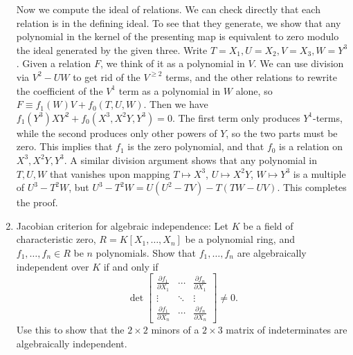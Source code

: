 \documentclass[12pt]{amsart}
\newcommand{\Q}{\mathbb{Q}}
\newcommand{\Z}{\mathbb{Z}}
\newcommand\itemB{\stepcounter{enumi}\item[(\theenumi)]}
\begin{document}
\begin{enumerate}
{Now we compute the ideal of relations. We can check directly that each relation is in the defining ideal. To see that they generate, we show that any polynomial in the kernel of the presenting map is equivalent to zero modulo the ideal generated by the given three. Write $T=X_1, U=X_2, V=X_3, W=Y^3$. Given a relation $F$, we think of it as a polynomial in $V$. We can use division via $V^2-UW$ to get rid of the $V^{\geq 2}$ terms, and the other relations to rewrite the coefficient of the $V^1$ term as a polynomial in $W$ alone, so $F\equiv f_1(W) V + f_0(T,U,W)$. Then we have $f_1(Y^3) XY^2 + f_0(X^3, X^2Y, Y^3)=0$. The first term only produces $Y^1$-terms, while the second produces only other powers of $Y$, so the two parts must be zero. This implies that $f_1$ is the zero polynomial, and that $f_0$ is a relation on $X^3, X^2Y, Y^3$. A similar division argument shows that any polynomial in $T,U,W$ that vanishes upon mapping $T\mapsto X^3$, $U\mapsto X^2 Y$, $W\mapsto Y^3$ is a multiple of $U^3-T^2W$, but $U^3-T^2W=U(U^2-TV)-T(TW-UV)$. This completes the proof.
}



\itemB Jacobian criterion for algebraic independence: Let $K$ be a field of characteristic zero, $R=K[X_1,\dots,X_n]$ be a polynomial ring, and ${f_1,\dots,f_n\in R}$ be $n$ polynomials. Show that $f_1,\dots,f_n$ are algebraically independent over $K$ if and only if 
\[ \det \begin{bmatrix} \frac{\partial f_1}{\partial X_1} & \cdots & \frac{\partial f_n}{\partial X_1} \\
\vdots & \ddots & \vdots \\
 \frac{\partial f_1}{\partial X_n} & \cdots & \frac{\partial f_n}{\partial X_n} \end{bmatrix}  \neq 0.\]
 Use this to show that the $2\times 2$ minors of a $2\times 3$ matrix of indeterminates are algebraically independent.
 







\end{enumerate}


\vfill
\end{document}
